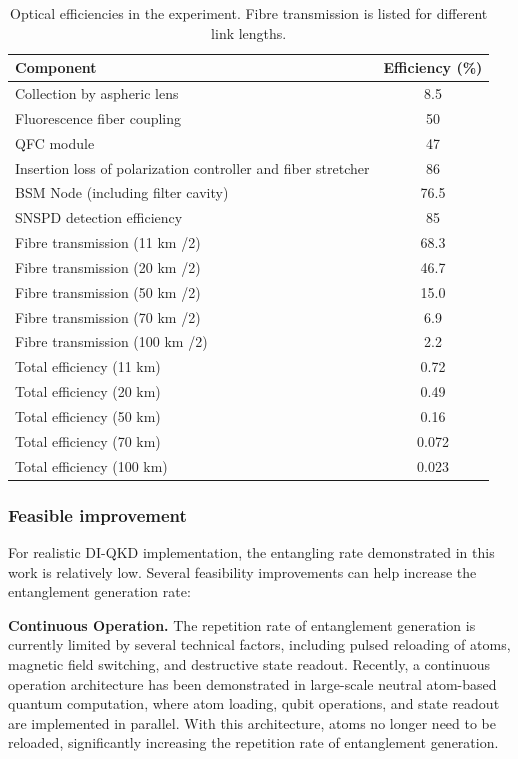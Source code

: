 \documentclass[aps,reprint,showpacs,superscriptaddress]{revtex4-2}
\begin{document}
\begin{table}[htbp]
	\centering
	\caption{Optical efficiencies in the experiment. Fibre transmission is listed for different link lengths.}
	\begin{tabular}{l c}
		\hline
		Component & Efficiency (\%) \\
		\hline
		Collection by aspheric lens & 8.5 \\
		Fluorescence fiber coupling & 50 \\
		QFC module                 & 47 \\
		Insertion loss of polarization controller and fiber stretcher   &86   \\
		BSM Node (including filter cavity)            	& 76.5 \\
		SNSPD detection efficiency & 85 \\
		\hline
		Fibre transmission (11 km /2) & 68.3 \\
		Fibre transmission (20 km /2) & 46.7 \\
		Fibre transmission (50 km /2) & 15.0 \\
		Fibre transmission (70 km /2) & 6.9 \\
		Fibre transmission (100 km /2) & 2.2 \\
		\hline
		Total efficiency (11 km)   & 0.72 \\
		Total efficiency (20 km)   & 0.49 \\
		Total efficiency (50 km)   & 0.16 \\
		Total efficiency (70 km)   & 0.072 \\
		Total efficiency (100 km)  & 0.023 \\
		\hline
	\end{tabular}
\end{table}

\subsubsection{Feasible improvement}
For realistic DI-QKD implementation, the entangling rate demonstrated in this work is relatively low. Several feasibility improvements can help increase the entanglement generation rate:

\textbf{Continuous Operation.} The repetition rate of entanglement generation is currently limited by several technical factors, including pulsed reloading of atoms, magnetic field switching, and destructive state readout. Recently, a continuous operation architecture has been demonstrated in large-scale neutral atom-based quantum computation, where atom loading, qubit operations, and state readout are implemented in parallel. With this architecture, atoms no longer need to be reloaded, significantly increasing the repetition rate of entanglement generation.
\end{document}
